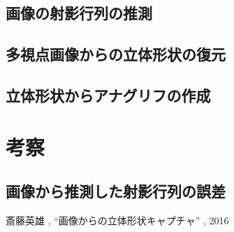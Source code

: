 \documentclass[11pt,a4j]{jsarticle}
\begin{document}
\subsection{画像の射影行列の推測}
\label{sub:result_syaei}

\subsection{多視点画像からの立体形状の復元}
\label{sub:result_multimage}

\subsection{立体形状からアナグリフの作成}
\label{sub:result_anaglyph}

\section{考察}
\label{sec:考察}

\subsection{画像から推測した射影行列の誤差}
\label{sub:画像から推測した射影行列の誤差}






\begin{thebibliography}{9} %
 斎藤英雄 , ``画像からの立体形状キャプチャ'' , 2016
\end{thebibliography}
\end{document}
